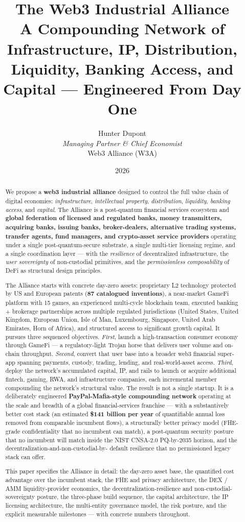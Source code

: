 \documentclass[11pt]{article}
\title{\textbf{The Web3 Industrial Alliance}\\
\large A Compounding Network of Infrastructure, IP, Distribution, Liquidity,
Banking Access, and Capital --- Engineered From Day One}
\author{Hunter Dupont\\
\textit{Managing Partner \& Chief Economist}\\
Web3 Alliance (W3A)}
\date{2026}
\begin{document}
\luxcoverpage

\begin{abstract}
\noindent
We propose a \textbf{web3 industrial alliance} designed to control the
full value chain of digital economies: \emph{infrastructure},
\emph{intellectual property}, \emph{distribution}, \emph{liquidity},
\emph{banking access}, and \emph{capital}. The Alliance is a
post-quantum financial services ecosystem and \textbf{global federation
of licensed and regulated banks, money transmitters, acquiring banks,
issuing banks, broker-dealers, alternative trading systems, transfer
agents, fund managers, and crypto-asset service providers} operating
under a single post-quantum-secure substrate, a single multi-tier
licensing regime, and a single coordination layer --- with the
\emph{resilience} of decentralized infrastructure, the \emph{user
sovereignty} of non-custodial primitives, and the
\emph{permissionless composability} of DeFi as structural design
principles.

The Alliance starts with concrete day-zero assets: proprietary L2
technology protected by US and European patents (\textbf{87 catalogued
inventions}), a near-market GameFi platform with 15 games, an
experienced multi-cycle blockchain team, executed banking + brokerage
partnerships across multiple regulated jurisdictions (United States,
United Kingdom, European Union, Isle of Man, Luxembourg, Singapore,
United Arab Emirates, Horn of Africa), and structured access to
significant growth capital. It pursues three sequenced objectives.
\emph{First}, launch a high-transaction consumer economy through GameFi
--- a regulatory-light Trojan horse that delivers user volume and
on-chain throughput. \emph{Second}, convert that user base into a
broader web3 financial super-app spanning payments, custody, trading,
lending, and real-world-asset access. \emph{Third}, deploy the
network's accumulated capital, IP, and rails to launch or acquire
additional fintech, gaming, RWA, and infrastructure companies, each
incremental member compounding the network's structural value. The
result is not a single startup. It is a deliberately engineered
\textbf{PayPal-Mafia-style compounding network} operating at the scale
and breadth of a global financial-services franchise --- with a
substantively better cost stack (an estimated \textbf{\$141 billion
per year} of quantifiable annual loss removed from comparable
incumbent flows), a structurally better privacy model (FHE-grade
confidentiality that no incumbent can match), a post-quantum security
posture that no incumbent will match inside the NIST CNSA-2.0
PQ-by-2035 horizon, and the decentralization-and-non-custodial-by-
default resilience that no permissioned legacy stack can offer.

This paper specifies the Alliance in detail: the day-zero asset base,
the quantified cost advantage over the incumbent stack, the FHE and
privacy architecture, the DEX / AMM liquidity-provider economics, the
decentralization-resilience and non-custodial-sovereignty posture, the
three-phase build sequence, the capital architecture, the IP licensing
architecture, the multi-entity governance model, the risk posture, and
the explicit measurable milestones --- with concrete numbers
throughout.
\end{abstract}
\end{document}

